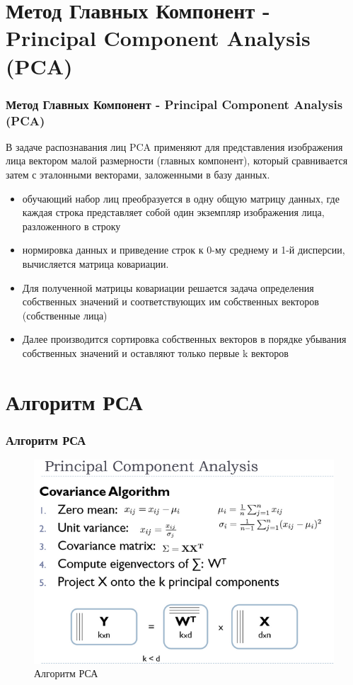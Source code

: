 \documentclass{beamer}
\begin{document}
\section{Метод Главных Компонент - Principal Component Analysis (PCA)}

\begin{frame}
\frametitle{Метод Главных Компонент - Principal Component Analysis (PCA)}

В задаче распознавания лиц PCA применяют для представления изображения лица вектором малой размерности (главных компонент), который сравнивается затем с эталонными векторами, заложенными в базу данных.

\begin{itemize}
\item обучающий набор лиц преобразуется в одну общую матрицу данных, где каждая строка представляет собой один экземпляр изображения лица, разложенного в строку
\item нормировка данных и приведение строк к 0-му среднему и 1-й дисперсии, вычисляется матрица ковариации.
\item Для полученной матрицы ковариации решается задача определения собственных значений и соответствующих им собственных векторов (собственные лица)
\item Далее производится сортировка собственных векторов в порядке убывания собственных значений и оставляют только первые k векторов
\end{itemize}

\end{frame}


\section{Алгоритм РСА}

\begin{frame}
\frametitle{Алгоритм РСА}

\begin{figure}[h!]
\centering
\includegraphics[scale=0.50]{res/pca_rules}
\caption{Алгоритм РСА}
\end{figure}

\end{frame}
\end{document}
